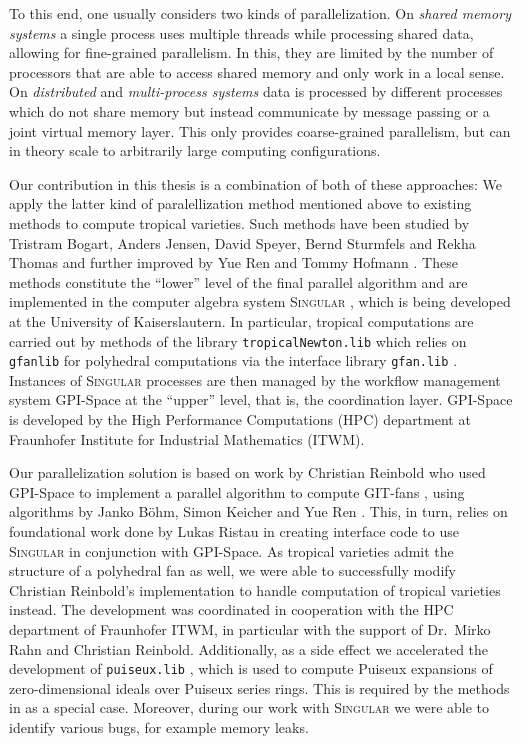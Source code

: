 \documentclass[
  paper=a4,
  titlepage,
  bibliography=totoc,
  pagesize=pdftex
]{scrartcl}
\numberwithin{figure}{section}
\numberwithin{equation}{section}
\numberwithin{table}{section}
\theoremstyle{definition}
\numberwithin{definition}{section}
\begin{document}
To this end, one usually considers two kinds of parallelization. On \emph{shared memory
systems} a single process uses multiple threads while processing shared data, allowing for
fine-grained parallelism. In this, they are limited by the number of processors that are
able to access shared memory and only work in a local sense. On \emph{distributed} and
\emph{multi-process systems} data is processed by different processes which do not share
memory but instead communicate by message passing or a joint virtual memory layer. This
only provides coarse-grained parallelism, but can in theory scale to arbitrarily large
computing configurations.

Our contribution in this thesis is a combination of both of these approaches: We apply the
latter kind of paralellization method mentioned above to existing methods to compute
tropical varieties. Such methods have been studied by Tristram Bogart, Anders Jensen,
David Speyer, Bernd Sturmfels and Rekha Thomas \cite{compTropVar} and further improved by
Yue Ren and Tommy Hofmann \cite{tropPointsLinks}. These methods constitute the
\enquote{lower} level of the final parallel algorithm and are implemented in the computer
algebra system \textsc{Singular} \cite{Singular}, which is being developed at the
University of Kaiserslautern. In particular, tropical computations are carried out by
methods of the library \texttt{tropicalNewton.lib} \cite{tropNewtLib} which relies on
\texttt{gfanlib} \cite{gfan} for polyhedral computations via the interface library
\texttt{gfan.lib} \cite{gfanLib}. Instances of \textsc{Singular} processes are then
managed by the workflow management system GPI-Space \cite{gpispace} at the \enquote{upper}
level, that is, the coordination layer. GPI-Space is developed by the High Performance
Computations (HPC) department at Fraunhofer Institute for Industrial Mathematics (ITWM).

Our parallelization solution is based on work by Christian Reinbold who used GPI-Space to
implement a parallel algorithm to compute GIT-fans \cite{reinboldGitFan}, using algorithms
by Janko Böhm, Simon Keicher and Yue Ren \cite{compGitFan}. This, in turn, relies on
foundational work done by Lukas Ristau in creating interface code to use \textsc{Singular}
in conjunction with GPI-Space. As tropical varieties admit the structure of a polyhedral
fan as well, we were able to successfully modify Christian Reinbold's implementation to
handle computation of tropical varieties instead. The development was coordinated in
cooperation with the HPC department of Fraunhofer ITWM, in particular with the support of
Dr.~Mirko Rahn and Christian Reinbold. Additionally, as a side effect we accelerated the
development of \texttt{puiseux.lib} \cite{puiseuxLib}, which is used to compute Puiseux
expansions of zero-dimensional ideals over Puiseux series rings. This is required by the
methods in \cite{tropPointsLinks} as a special case. Moreover, during our work with
\textsc{Singular} we were able to identify various bugs, for example memory leaks.
\end{document}
